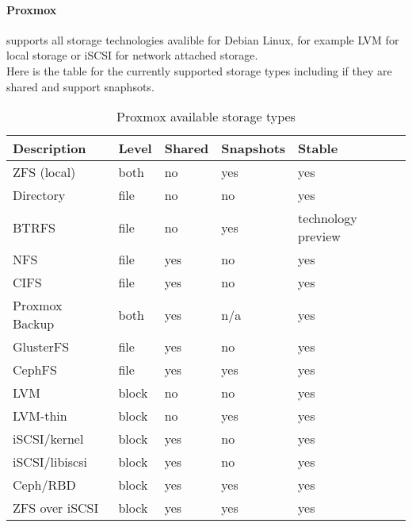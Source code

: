 \paragraph{Proxmox} supports all storage technologies avalible for Debian Linux, for example LVM for local storage or iSCSI for network attached storage.
\\
Here is the table for the currently supported storage types including if they are shared and support snaphsots.

\begin{table}[H]
    \label{tab:storageTable}
    \centering
    \caption{Proxmox available storage types}
    \begin{tabular}{|l|l|l|l|l|}
        \hline
        \textbf{Description} & \textbf{Level} & \textbf{Shared} & \textbf{Snapshots} & \textbf{Stable} \\ \hline
        ZFS (local)           & both           & no              & yes                & yes             \\ \hline
        Directory             & file           & no              & no                 & yes             \\ \hline
        BTRFS                 & file           & no              & yes                & technology preview \\ \hline
        NFS                   & file           & yes             & no                 & yes             \\ \hline
        CIFS                  & file           & yes             & no                 & yes             \\ \hline
        Proxmox Backup        & both           & yes             & n/a                & yes             \\ \hline
        GlusterFS             & file           & yes             & no                 & yes             \\ \hline
        CephFS                & file           & yes             & yes                & yes             \\ \hline
        LVM                   & block          & no              & no                 & yes             \\ \hline
        LVM-thin              & block          & no              & yes                & yes             \\ \hline
        iSCSI/kernel          & block          & yes             & no                 & yes             \\ \hline
        iSCSI/libiscsi        & block          & yes             & no                 & yes             \\ \hline
        Ceph/RBD              & block          & yes             & yes                & yes             \\ \hline
        ZFS over iSCSI        & block          & yes             & yes                & yes             \\ \hline
    \end{tabular}
\end{table}

